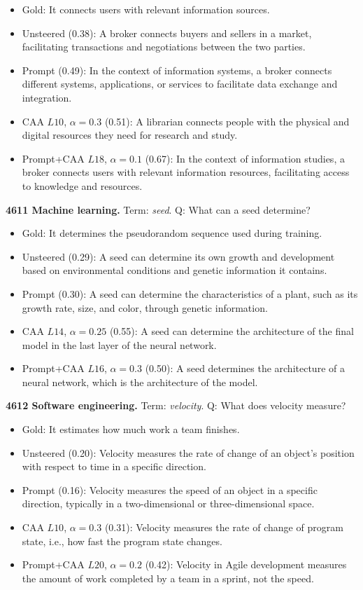 \begin{itemize}\setlength{\itemsep}{0.15em}\setlength{\parsep}{0pt}\setlength{\topsep}{0.2em}
\item Gold: It connects users with relevant information sources.
\item Unsteered (0.38): A broker connects buyers and sellers in a market, facilitating transactions and negotiations between the two parties.
\item Prompt (0.49): In the context of information systems, a broker connects different systems, applications, or services to facilitate data exchange and integration.
\item CAA $L10$, $\alpha=0.3$ (0.51): A librarian connects people with the physical and digital resources they need for research and study.
\item Prompt+CAA $L18$, $\alpha=0.1$ (0.67): In the context of information studies, a broker connects users with relevant information resources, facilitating access to knowledge and resources.
\end{itemize}
\medskip\noindent\textbf{4611 Machine learning.} Term: \emph{seed}.
Q: What can a seed determine?
\begin{itemize}\setlength{\itemsep}{0.15em}\setlength{\parsep}{0pt}\setlength{\topsep}{0.2em}
\item Gold: It determines the pseudorandom sequence used during training.
\item Unsteered (0.29): A seed can determine its own growth and development based on environmental conditions and genetic information it contains.
\item Prompt (0.30): A seed can determine the characteristics of a plant, such as its growth rate, size, and color, through genetic information.
\item CAA $L14$, $\alpha=0.25$ (0.55): A seed can determine the architecture of the final model in the last layer of the neural network.
\item Prompt+CAA $L16$, $\alpha=0.3$ (0.50): A seed determines the architecture of a neural network, which is the architecture of the model.
\end{itemize}
\medskip\noindent\textbf{4612 Software engineering.} Term: \emph{velocity}.
Q: What does velocity measure?
\begin{itemize}\setlength{\itemsep}{0.15em}\setlength{\parsep}{0pt}\setlength{\topsep}{0.2em}
\item Gold: It estimates how much work a team finishes.
\item Unsteered (0.20): Velocity measures the rate of change of an object's position with respect to time in a specific direction.
\item Prompt (0.16): Velocity measures the speed of an object in a specific direction, typically in a two-dimensional or three-dimensional space.
\item CAA $L10$, $\alpha=0.3$ (0.31): Velocity measures the rate of change of program state, i.e., how fast the program state changes.
\item Prompt+CAA $L20$, $\alpha=0.2$ (0.42): Velocity in Agile development measures the amount of work completed by a team in a sprint, not the speed.
\end{itemize}
